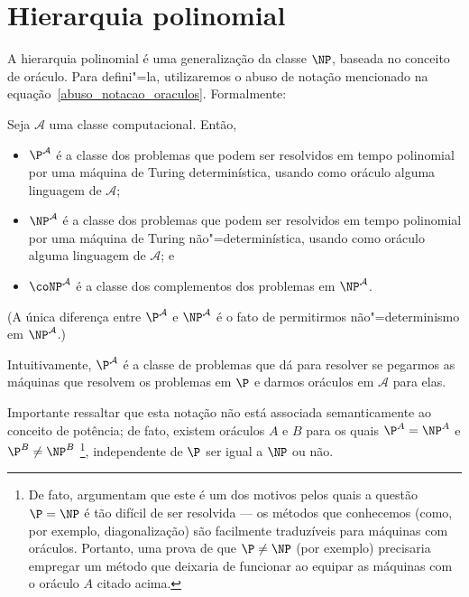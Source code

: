 \section{Hierarquia polinomial}
\label{hierarquia_polinomial}

A hierarquia polinomial é uma generalização da classe $\NP$,
baseada no conceito de oráculo.
Para defini"=la,
utilizaremos o abuso de notação mencionado na equação~\ref{abuso_notacao_oraculos}.
Formalmente:

\begin{definition}
    Seja $\mathcal A$ uma classe computacional.
    Então,
    \begin{itemize}
        \item $\P^\mathcal A$
            é a classe dos problemas que podem ser resolvidos em tempo polinomial
            por uma máquina de Turing determinística,
            usando como oráculo alguma linguagem de $\mathcal A$;
        \item $\NP^\mathcal A$
            é a classe dos problemas que podem ser resolvidos em tempo polinomial
            por uma máquina de Turing não"=determinística,
            usando como oráculo alguma linguagem de $\mathcal A$;
            e
        \item $\coNP^\mathcal A$
            é a classe dos complementos dos problemas em $\NP^\mathcal A$.
    \end{itemize}
\end{definition}

(A única diferença entre $\P^\mathcal A$ e $\NP^\mathcal A$
é o fato de permitirmos não"=determinismo em $\NP^\mathcal A$.)

Intuitivamente,
$\P^\mathcal A$ é a classe de problemas que dá para resolver
se pegarmos as máquinas que resolvem os problemas em $\P$
e darmos oráculos em $\mathcal A$ para elas.

Importante ressaltar que esta notação
não está associada semanticamente ao conceito de potência;
de fato,
existem oráculos $A$ e $B$ para os quais
$\P ^ A = \NP ^ A$ e $\P ^ B \neq \NP ^ B$
\cite[p.~362]{HopcroftUllman1979}%
\footnote{
    De fato, 
    argumentam que este é um dos motivos pelos quais
    a questão $\P = \NP$ é tão difícil de ser resolvida
    --- os métodos que conhecemos
    (como, por exemplo, diagonalização)
    são facilmente traduzíveis para máquinas com oráculos.
    Portanto,
    uma prova de que $\P \neq \NP$ (por exemplo)
    precisaria empregar um método que deixaria de funcionar
    ao equipar as máquinas com o oráculo $A$ citado acima.
},
independente de $\P$ ser igual a $\NP$ ou não.

